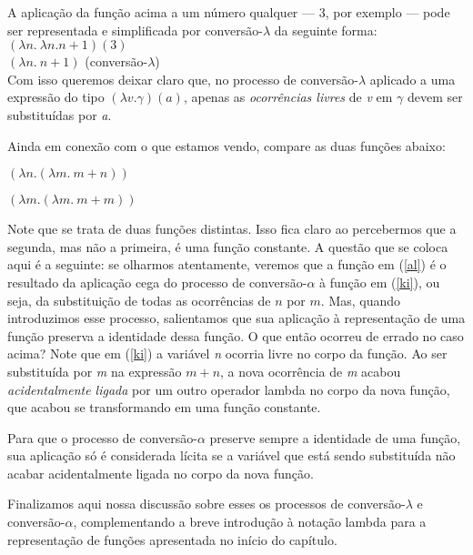 A aplicação da função acima a um número qualquer --- 3, por
exemplo --- pode ser representada e simplificada por
conversão-$\lambda$ da
seguinte forma:\\

\n $(\lambda n.\ \lambda n. n+1)(3)$\\
$(\lambda n.\ n+1)$ \hfill (conversão-$\lambda$)\\

\n Com isso queremos deixar claro que, no processo de
conversão-$\lambda$ aplicado a uma expressão do tipo $(\lambda v.
\gamma)(a)$, apenas as \textit{ocorrências livres} de
\textit{v} em $\gamma$ devem ser substituídas por \textit{a}.

Ainda em conexão com o que estamos vendo, compare as duas
funções abaixo:

\begin{exe}
	\ex $(\lambda n.(\lambda m.\ m+n))$ \label{ki}
\end{exe}

\begin{exe}
	\ex $(\lambda m.(\lambda m.\ m+m))$ \label{al}
\end{exe}


\n Note que se trata de duas funções distintas. Isso fica
claro ao percebermos que a segunda, mas não a primeira, é uma
função constante. A questão que se coloca aqui é a seguinte: se
olharmos atentamente, veremos que a função em (\ref{al}) é o
resultado da aplicação cega do processo de conversão-$\alpha$ à
função em (\ref{ki}), ou seja, da substituição de todas as ocorrências de $n$ por $m$. Mas, quando introduzimos esse processo,
salientamos que sua aplicação à representação de uma função
preserva a identidade dessa função. O que então ocorreu de
errado no caso acima? Note que em (\ref{ki}) a variável \textit{n}
ocorria livre no corpo da função. Ao ser substituída por
\textit{m} na expressão $m+n$, a nova ocorrência de
\textit{m} acabou \textit{acidentalmente ligada} por um outro
operador lambda no corpo da nova função, que acabou se
transformando em uma função constante.

Para que o processo de conversão-$\alpha$ preserve sempre a
identidade de uma função, sua aplicação só é considerada
lícita se a variável que está sendo substituída não acabar
acidentalmente ligada no corpo da nova função.

Finalizamos aqui nossa discussão sobre esses os processos de conversão-$\lambda$ e conversão-$\alpha$,
complementando a breve introdução à notação lambda para a representação de funções apresentada no início do capítulo.

